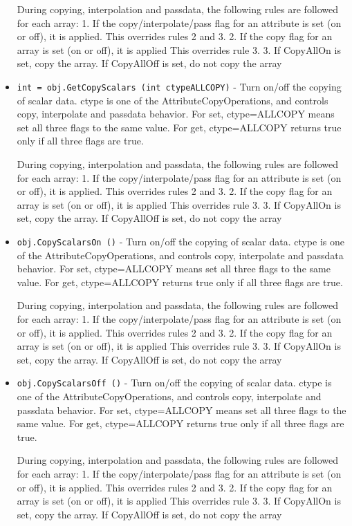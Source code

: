 \begin{itemize}
 During copying, interpolation and passdata, the following rules are 
 followed for each array:
 1. If the copy/interpolate/pass flag for an attribute is set (on or off), it is applied.
    This overrides rules 2 and 3.
 2. If the copy flag for an array is set (on or off), it is applied
    This overrides rule 3.
 3. If CopyAllOn is set, copy the array.
    If CopyAllOff is set, do not copy the array

\item  \verb|int = obj.GetCopyScalars (int ctypeALLCOPY)| -  Turn on/off the copying of scalar data.
 ctype is one of the AttributeCopyOperations, and controls copy, 
 interpolate and passdata behavior.
 For set, ctype=ALLCOPY means set all three flags to the same value.
 For get, ctype=ALLCOPY returns true only if all three flags are true.

 During copying, interpolation and passdata, the following rules are 
 followed for each array:
 1. If the copy/interpolate/pass flag for an attribute is set (on or off), it is applied.
    This overrides rules 2 and 3.
 2. If the copy flag for an array is set (on or off), it is applied
    This overrides rule 3.
 3. If CopyAllOn is set, copy the array.
    If CopyAllOff is set, do not copy the array

\item  \verb|obj.CopyScalarsOn ()| -  Turn on/off the copying of scalar data.
 ctype is one of the AttributeCopyOperations, and controls copy, 
 interpolate and passdata behavior.
 For set, ctype=ALLCOPY means set all three flags to the same value.
 For get, ctype=ALLCOPY returns true only if all three flags are true.

 During copying, interpolation and passdata, the following rules are 
 followed for each array:
 1. If the copy/interpolate/pass flag for an attribute is set (on or off), it is applied.
    This overrides rules 2 and 3.
 2. If the copy flag for an array is set (on or off), it is applied
    This overrides rule 3.
 3. If CopyAllOn is set, copy the array.
    If CopyAllOff is set, do not copy the array

\item  \verb|obj.CopyScalarsOff ()| -  Turn on/off the copying of scalar data.
 ctype is one of the AttributeCopyOperations, and controls copy, 
 interpolate and passdata behavior.
 For set, ctype=ALLCOPY means set all three flags to the same value.
 For get, ctype=ALLCOPY returns true only if all three flags are true.

 During copying, interpolation and passdata, the following rules are 
 followed for each array:
 1. If the copy/interpolate/pass flag for an attribute is set (on or off), it is applied.
    This overrides rules 2 and 3.
 2. If the copy flag for an array is set (on or off), it is applied
    This overrides rule 3.
 3. If CopyAllOn is set, copy the array.
    If CopyAllOff is set, do not copy the array


\end{itemize}
